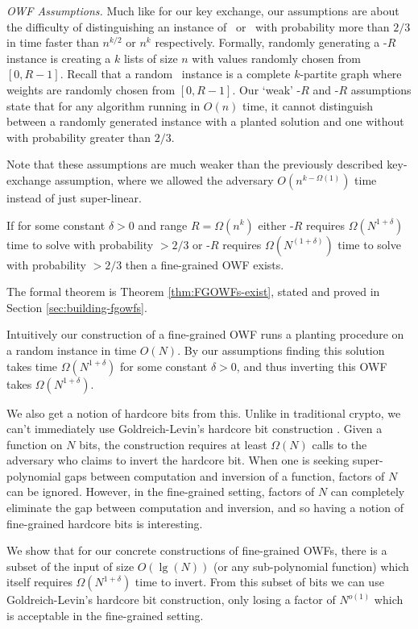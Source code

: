 \textit{OWF Assumptions.} Much like for our key exchange, our assumptions are about the difficulty of distinguishing an instance of \kSum~or \zkclique~with probability more than $2/3$ in time faster than $n^{k/2}$ or $n^k$ respectively. Formally, randomly generating a \kSum-$R$ instance is creating a $k$ lists of size $n$ with values randomly chosen from $[0,R-1]$. Recall that a random \zkclique~instance is a complete $k$-partite graph where weights are randomly chosen from $[0,R-1]$. Our `weak' \kSum-$R$ and \zkclique-$R$ assumptions state that for any algorithm running in $O(n)$ time, it cannot distinguish between a randomly generated instance with a planted solution and one without with probability greater than $2/3$.

Note that these assumptions are much weaker than the previously described key-exchange assumption, where we allowed the adversary $O(n^{k-\Omega(1)})$ time instead of just super-linear.

\begin{theorem}
	If for some constant $\delta>0$ and range $R = \Omega(n^k)$ either \kSum-$R$ requires $\Omega(N^{1+\delta})$ time to solve with probability $>2/3$ or \zkclique-$R$ requires $\Omega(N^{(1+\delta)})$ time to solve with probability $>2/3$  then a fine-grained OWF exists.
\end{theorem}
The formal theorem is Theorem \ref{thm:FGOWFs-exist}, stated and proved in Section \ref{sec:building-fgowfs}.

Intuitively our construction of a fine-grained OWF runs a planting procedure on a random instance in time $O(N)$. By our assumptions finding this solution takes time $\Omega(N^{1+\delta})$ for some constant $\delta > 0$, and thus inverting this OWF takes $\Omega(N^{1+\delta})$.

We also get a notion of hardcore bits from this. Unlike in traditional crypto, we can't immediately use Goldreich-Levin's hardcore bit construction \cite{hardCoreBitsAndXorLemmaFromGL}. Given a function on $N$ bits, the construction requires at least $\Omega(N)$ calls to the adversary who claims to invert the hardcore bit. When one is seeking super-polynomial gaps between computation and inversion of a function, factors of $N$ can be ignored. However, in the fine-grained setting, factors of $N$ can completely eliminate the gap between computation and inversion, and so having a notion of fine-grained hardcore bits is interesting.

We show that for our concrete constructions of fine-grained OWFs, there is a subset of the input of size $O(\lg(N))$ (or any sub-polynomial function) which itself requires $\Omega(N^{1+\delta})$ time to invert. From this subset of bits we can use Goldreich-Levin's hardcore bit construction, only losing a factor of $N^{o(1)}$ which is acceptable in the fine-grained setting.

